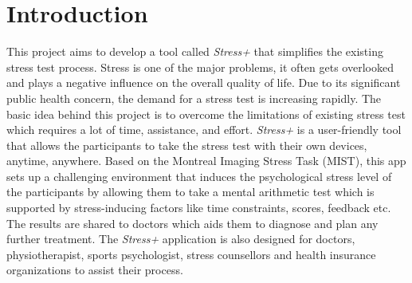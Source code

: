 \section{Introduction}
\label{sec:introduction}

This project aims to develop a tool called \textit{Stress+} that simplifies the existing stress test process. 
Stress is one of the major problems, it often gets overlooked and plays a negative influence on the overall quality of life. 
Due to its significant public health concern, the demand for a stress test is increasing rapidly. 
The basic idea behind this project is to overcome the limitations of existing stress test which requires a lot of time, assistance, and effort. 
\textit{Stress+} is a user-friendly tool that allows the participants to take the stress test with their own devices, anytime, anywhere. 
Based on the Montreal Imaging Stress Task (MIST), this app sets up a challenging environment that induces the psychological stress level of the participants by allowing them to take a mental arithmetic test which is supported by stress-inducing factors like time constraints, scores, feedback etc. 
The results are shared to doctors which aids them to diagnose and plan any further treatment.
The \textit{Stress+} application is also designed for doctors, physiotherapist, sports psychologist, stress counsellors and health insurance organizations to assist their process.
